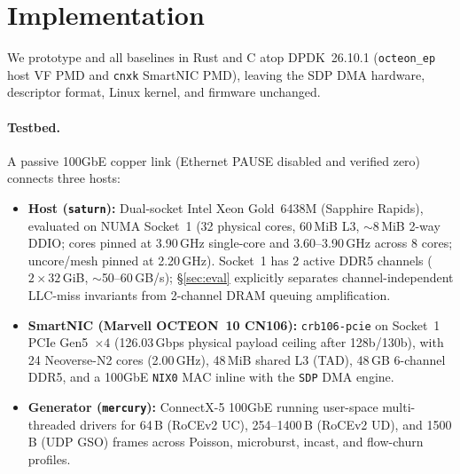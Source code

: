\section{Implementation}
\label{sec:implementation}

We prototype \sys{} and all baselines in Rust and C atop DPDK~26.10.1
(\texttt{octeon\_ep} host VF PMD and \texttt{cnxk} SmartNIC PMD), leaving the
SDP DMA hardware, descriptor format, Linux kernel, and firmware unchanged.

\paragraph{Testbed.}
A passive 100GbE copper link (Ethernet PAUSE disabled and verified zero)
connects three hosts:
\begin{itemize}
\item \textbf{Host (\texttt{saturn}):} Dual-socket Intel Xeon Gold~6438M
  (Sapphire Rapids), evaluated on NUMA Socket~1 (32 physical cores, 60\,MiB
  L3, $\sim$8\,MiB 2-way DDIO; cores pinned at 3.90\,GHz single-core and
  3.60--3.90\,GHz across 8 cores; uncore/mesh pinned at 2.20\,GHz). Socket~1
  has 2 active DDR5 channels ($2\times 32$\,GiB, $\sim$50--60\,GB/s);
  \S\ref{sec:eval} explicitly separates channel-independent LLC-miss invariants
  from 2-channel DRAM queuing amplification.
\item \textbf{SmartNIC (Marvell OCTEON~10 CN106):} \texttt{crb106-pcie} on
  Socket~1 PCIe Gen5~$\times 4$ (126.03\,Gbps physical payload ceiling after
  128b/130b), with 24 Neoverse-N2 cores (2.00\,GHz), 48\,MiB shared L3 (TAD),
  48\,GB 6-channel DDR5, and a 100GbE \texttt{NIX0} MAC inline with the
  \texttt{SDP} DMA engine.
\item \textbf{Generator (\texttt{mercury}):} ConnectX-5 100GbE running
  user-space multi-threaded drivers for 64\,B (RoCEv2 UC), 254--1400\,B
  (RoCEv2 UD), and 1500\,B (UDP GSO) frames across Poisson, microburst, incast,
  and flow-churn profiles.
\end{itemize}


